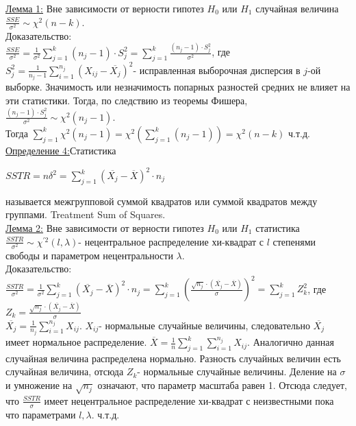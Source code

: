 \documentclass[a4paper]{article}
\begin{document}
\underline{Лемма 1:} Вне зависимости от верности гипотез $H_0$ или $H_1$ случайная величина $\frac{SSE}{\sigma^2} \sim \chi^2(n - k)$.\\
Доказательство:\\
$\frac{SSE}{\sigma^2} = \frac{1}{\sigma^2} \sum\limits_{j = 1}^{k}(n_j - 1)\cdot S_j^2 = \sum\limits_{j = 1}^{k}\frac{(n_j - 1)\cdot S_j^2}{\sigma^2}$, где
$S_j^2 = \frac{1}{n_j - 1}\sum\limits_{i = 1}^{n_j}(X_{ij} - \overline{X_j})^2$- исправленная выборочная дисперсия в $j$-ой выборке. Значимость или незначимость попарных разностей средних не влияет на эти статистики. Тогда, по следствию из теоремы Фишера, $\frac{(n_j - 1)\cdot S_j^2}{\sigma^2} \sim\chi^2(n_j - 1)$.\\
Тогда $\sum\limits_{j = 1}^{k}\chi^2(n_j - 1) = \chi^2(\sum\limits_{j = 1}^{k}(n_j - 1)) = \chi^2(n - k)$ ч.т.д.\\
\underline{Определение 4:}Статистика
\begin{center}
    $SSTR = n\delta^2 = \sum\limits_{j = 1}^{k}(\overline{X_j} - \overline{X})^2\cdot n_j$
\end{center}
называется межгрупповой суммой квадратов или суммой квадратов между группами. Treatment Sum of Squares.\\
\underline{Лемма 2:} Вне зависимости от верности гипотез $H_0$ или $H_1$ статистика $\frac{SSTR}{\sigma^2}\sim\chi^{'2}(l, \lambda)$- нецентральное распределение хи-квадрат с $l$ степенями свободы и параметром нецентральности $\lambda$.\\
Доказательство: $\frac{SSTR}{\sigma^2} = \frac{1}{\sigma^2}\sum\limits_{j = 1}^{k}(\overline{X_j} - \overline{X})^2\cdot n_j = \sum\limits_{j = 1}^{k}(\frac{\sqrt{n_j} \cdot (\overline{X_j} - \overline{X})}{\sigma})^2 = \sum\limits_{j = 1}^{k} Z_k^2$, где $Z_k = \frac{\sqrt{n_j} \cdot (\overline{X_j} - \overline{X})}{\sigma}$\\
$\overline{X_j} = \frac{1}{n_j}\sum\limits_{i = 1}^{n_j}X_{ij}$. $X_{ij}$- нормальные случайные величины, следовательно $\overline{X_j}$ имеет нормальное распределение. $\overline{X} = \frac{1}{n}\sum\limits_{j = 1}^{k}\sum\limits_{i = 1}^{n_j}X_{ij}$. Аналогично данная случайная величина распределена нормально. Разность случайных величин есть случайная величина, отсюда $Z_k$- нормальные случайные величины. Деление на $\sigma$ и умножение на $\sqrt{n_j}$ означают, что параметр масштаба равен 1. Отсюда следует, что $\frac{SSTR}{\sigma}$ имеет нецентральное распределение хи-квадрат с неизвестными пока что параметрами $l, \lambda$. ч.т.д.\\
\end{document}
